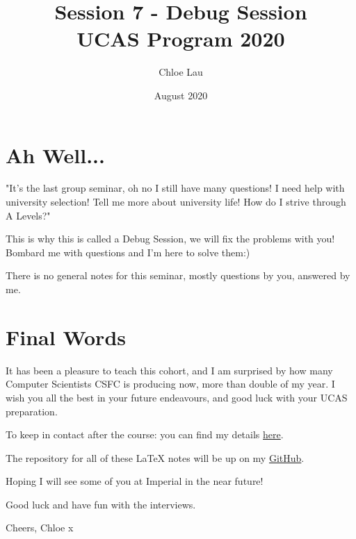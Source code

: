 \documentclass[12pt]{article}
\title{\vspace{-2cm} \textbf{Session 7 - Debug Session} \\ UCAS Program 2020}
\author{Chloe Lau}
\date{August 2020}
\begin{document}
\setlength{\parindent}{4ex}
\setlength{\parskip}{1em}

\maketitle

\section{Ah Well...}
"It's the last group seminar, oh no I still have many questions! I need help with university selection! Tell me more about university life! How do I strive through A Levels?"

This is why this is called a Debug Session, we will fix the problems with you! Bombard me with questions and I'm here to solve them:)

There is no general notes for this seminar, mostly questions by you, answered by me.

\section{Final Words}
It has been a pleasure to teach this cohort, and I am surprised by how many Computer Scientists CSFC is producing now, more than double of my year. I wish you all the best in your future endeavours, and good luck with your UCAS preparation.

To keep in contact after the course: you can find my details \href{https://chloelwt.com}{here}.

The repository for all of these \LaTeX{} notes will be up on my \href{https://github.com/chloelaucodes/ucas_program_notes}{GitHub}.

Hoping I will see some of you at Imperial in the near future!

Good luck and have fun with the interviews.

\setlength{\parindent}{0pt}
Cheers,\newline
Chloe x
\end{document}
